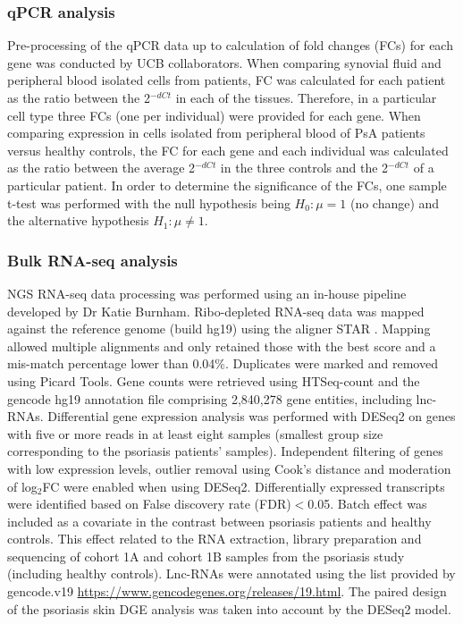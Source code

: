 \subsubsection{qPCR analysis}
Pre-processing of the qPCR data up to calculation of fold changes (FCs) for each gene was conducted by UCB collaborators. When comparing synovial fluid and peripheral blood isolated cells from patients, FC was calculated for each patient as the ratio between the 2$^{-dCt}$ in each of the tissues. Therefore, in a particular cell type three FCs (one per individual) were provided for each gene. When comparing expression in cells isolated from peripheral blood of PsA patients versus healthy controls, the FC for each gene and each individual was calculated as the ratio between the average 2$^{-dCt}$ in the three controls and the 2$^{-dCt}$ of a particular patient. In order to determine the significance of the FCs, one sample t-test was performed with the null hypothesis being $H_0:\mu=1$ (no change) and the alternative hypothesis $H_1:\mu\neq 1$. 


\subsubsection{Bulk RNA-seq analysis}
NGS RNA-seq data processing was performed using an in-house pipeline developed by Dr Katie Burnham. Ribo-depleted RNA-seq data was mapped against the reference genome (build hg19) using the aligner STAR \parencite{Dobin2013}. Mapping allowed multiple alignments and only retained those with the best score and a mis-match percentage lower than 0.04\%. Duplicates were marked and removed using Picard Tools. Gene counts were retrieved using HTSeq-count and the gencode hg19 annotation file comprising 2,840,278 gene entities, including lnc-RNAs. Differential gene expression analysis was performed with DESeq2 on genes with five or more reads in at least eight samples (smallest group size corresponding to the psoriasis patients' samples). Independent filtering of genes with low expression levels, outlier removal using Cook's distance and moderation of log$_2$FC were enabled when using DESeq2. Differentially expressed transcripts were identified based on False discovery rate (FDR)$<$0.05. Batch effect was included as a covariate in the contrast between psoriasis patients and healthy controls. This effect related to the RNA extraction, library preparation and sequencing of cohort 1A and cohort 1B samples from the psoriasis study (including healthy controls). Lnc-RNAs were annotated using the list provided by gencode.v19 \url{https://www.gencodegenes.org/releases/19.html}. The paired design of the psoriasis skin DGE analysis was taken into account by the DESeq2 model.



